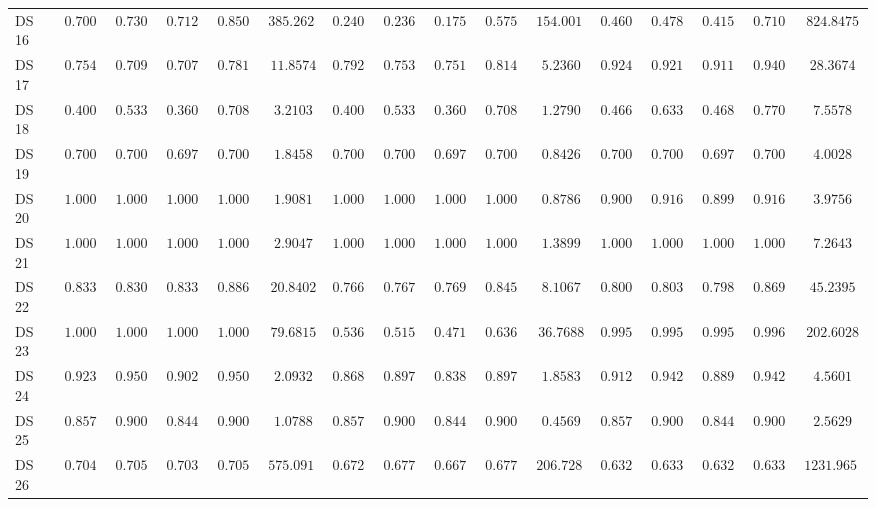 {\begin{longtable}{|l|ccccc|ccccc|ccccc|}
		DS 16 & $\boldsymbol{0.7000}$ & $\boldsymbol{0.7300}$ & $\boldsymbol{0.7120}$ & $\boldsymbol{0.8500}$ & $385.2624$ & $0.2400$ & $0.2367$ & $0.1753$ & $0.5759$ & $154.0014$ & $0.4600$ & $0.4783$ & $0.4155$ & $0.7102$ & $824.8475$ \\
		DS 17 & $0.7547$ & $0.7091$ & $0.7071$ & $0.7818$ & $11.8574$ & $0.7925$ & $0.7530$ & $0.7518$ & $0.8148$ & $5.2360$ & $\boldsymbol{0.9245}$ & $\boldsymbol{0.9212}$ & $\boldsymbol{0.9111}$ & $\boldsymbol{0.9409}$ & $28.3674$ \\
		DS 18 & $0.4000$ & $0.5333$ & $0.3600$ & $0.7083$ & $3.2103$ & $0.4000$ & $0.5333$ & $0.3600$ & $0.7083$ & $1.2790$ & $0.4667$ & $0.6333$ & $0.4689$ & $0.7708$ & $7.5578$ \\
		DS 19 & $0.7000$ & $0.7000$ & $0.6970$ & $0.7000$ & $1.8458$ & $0.7000$ & $0.7000$ & $0.6970$ & $0.7000$ & $0.8426$ & $\boldsymbol{0.7000}$ & $\boldsymbol{0.7000}$ & $\boldsymbol{0.6970}$ & $\boldsymbol{0.7000}$ & $4.0028$ \\
		DS 20 & $1.0000$ & $1.0000$ & $1.0000$ & $1.0000$ & $1.9081$ & $\boldsymbol{1.0000}$ & $\boldsymbol{1.0000}$ & $\boldsymbol{1.0000}$ & $\boldsymbol{1.0000}$ & $0.8786$ & $0.9000$ & $0.9167$ & $0.8990$ & $0.9167$ & $3.9756$ \\
		DS 21 & $1.0000$ & $1.0000$ & $1.0000$ & $1.0000$ & $2.9047$ & $1.0000$ & $1.0000$ & $1.0000$ & $1.0000$ & $1.3899$ & $\boldsymbol{1.0000}$ & $\boldsymbol{1.0000}$ & $\boldsymbol{1.0000}$ & $\boldsymbol{1.0000}$ & $7.2643$ \\
		DS 22 & $\boldsymbol{0.8333}$ & $\boldsymbol{0.8304}$ & $\boldsymbol{0.8331}$ & $\boldsymbol{0.8869}$ & $20.8402$ & $0.7667$ & $0.7679$ & $0.7694$ & $0.8452$ & $8.1067$ & $0.8000$ & $0.8036$ & $0.7989$ & $0.8690$ & $45.2395$ \\
		DS 23 & $\boldsymbol{1.0000}$ & $\boldsymbol{1.0000}$ & $\boldsymbol{1.0000}$ & $\boldsymbol{1.0000}$ & $79.6815$ & $0.5365$ & $0.5157$ & $0.4710$ & $0.6368$ & $36.7688$ & $0.9957$ & $0.9957$ & $0.9959$ & $0.9968$ & $202.6028$ \\
		DS 24 & $0.9231$ & $0.9500$ & $0.9023$ & $0.9500$ & $2.0932$ & $0.8681$ & $0.8976$ & $0.8385$ & $0.8976$ & $1.8583$ & $0.9121$ & $0.9429$ & $0.8897$ & $0.9429$ & $4.5601$ \\
		DS 25 & $0.8571$ & $0.9000$ & $0.8444$ & $0.9000$ & $1.0788$ & $0.8571$ & $0.9000$ & $0.8444$ & $0.9000$ & $0.4569$ & $0.8571$ & $0.9000$ & $0.8444$ & $0.9000$ & $2.5629$ \\
		DS 26 & $\boldsymbol{0.7040}$ & $\boldsymbol{0.7058}$ & $\boldsymbol{0.7039}$ & $\boldsymbol{0.7058}$ & $575.0917$ & $0.6720$ & $0.6776$ & $0.6678$ & $0.6776$ & $206.7283$ & $0.6320$ & $0.6333$ & $0.6320$ & $0.6333$ & $1231.9654$ \\

\end{longtable}}
